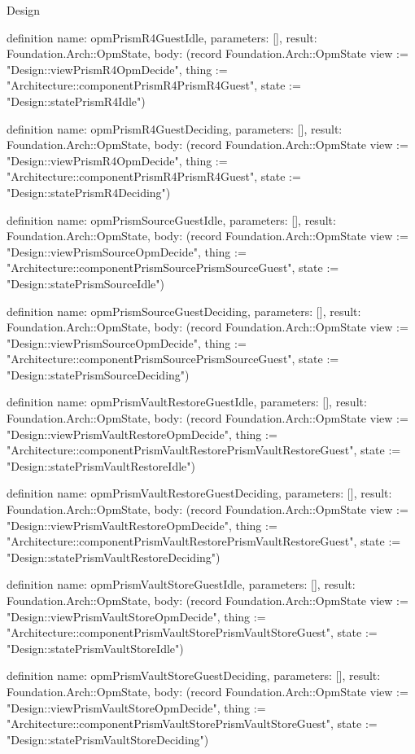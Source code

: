 \begin{lexlean}{Design}
\begin{semanticmodule}
definition{
  name: opmPrismR4GuestIdle,
  parameters: [],
  result: Foundation.Arch::OpmState,
  body: (record Foundation.Arch::OpmState {view := "Design::viewPrismR4OpmDecide", thing := "Architecture::componentPrismR4PrismR4Guest", state := "Design::statePrismR4Idle"})
}

definition{
  name: opmPrismR4GuestDeciding,
  parameters: [],
  result: Foundation.Arch::OpmState,
  body: (record Foundation.Arch::OpmState {view := "Design::viewPrismR4OpmDecide", thing := "Architecture::componentPrismR4PrismR4Guest", state := "Design::statePrismR4Deciding"})
}

definition{
  name: opmPrismSourceGuestIdle,
  parameters: [],
  result: Foundation.Arch::OpmState,
  body: (record Foundation.Arch::OpmState {view := "Design::viewPrismSourceOpmDecide", thing := "Architecture::componentPrismSourcePrismSourceGuest", state := "Design::statePrismSourceIdle"})
}

definition{
  name: opmPrismSourceGuestDeciding,
  parameters: [],
  result: Foundation.Arch::OpmState,
  body: (record Foundation.Arch::OpmState {view := "Design::viewPrismSourceOpmDecide", thing := "Architecture::componentPrismSourcePrismSourceGuest", state := "Design::statePrismSourceDeciding"})
}

definition{
  name: opmPrismVaultRestoreGuestIdle,
  parameters: [],
  result: Foundation.Arch::OpmState,
  body: (record Foundation.Arch::OpmState {view := "Design::viewPrismVaultRestoreOpmDecide", thing := "Architecture::componentPrismVaultRestorePrismVaultRestoreGuest", state := "Design::statePrismVaultRestoreIdle"})
}

definition{
  name: opmPrismVaultRestoreGuestDeciding,
  parameters: [],
  result: Foundation.Arch::OpmState,
  body: (record Foundation.Arch::OpmState {view := "Design::viewPrismVaultRestoreOpmDecide", thing := "Architecture::componentPrismVaultRestorePrismVaultRestoreGuest", state := "Design::statePrismVaultRestoreDeciding"})
}

definition{
  name: opmPrismVaultStoreGuestIdle,
  parameters: [],
  result: Foundation.Arch::OpmState,
  body: (record Foundation.Arch::OpmState {view := "Design::viewPrismVaultStoreOpmDecide", thing := "Architecture::componentPrismVaultStorePrismVaultStoreGuest", state := "Design::statePrismVaultStoreIdle"})
}

definition{
  name: opmPrismVaultStoreGuestDeciding,
  parameters: [],
  result: Foundation.Arch::OpmState,
  body: (record Foundation.Arch::OpmState {view := "Design::viewPrismVaultStoreOpmDecide", thing := "Architecture::componentPrismVaultStorePrismVaultStoreGuest", state := "Design::statePrismVaultStoreDeciding"})
}


\end{semanticmodule}
\end{lexlean}
